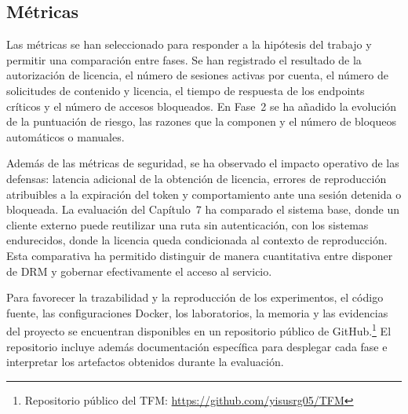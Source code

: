 \subsection{Métricas}

Las métricas se han seleccionado para responder a la hipótesis del trabajo y permitir una comparación entre fases. Se han registrado el resultado de la autorización de licencia, el número de sesiones activas por cuenta, el número de solicitudes de contenido y licencia, el tiempo de respuesta de los endpoints críticos y el número de accesos bloqueados. En Fase~2 se ha añadido la evolución de la puntuación de riesgo, las razones que la componen y el número de bloqueos automáticos o manuales.

Además de las métricas de seguridad, se ha observado el impacto operativo de las defensas: latencia adicional de la obtención de licencia, errores de reproducción atribuibles a la expiración del token y comportamiento ante una sesión detenida o bloqueada. La evaluación del Capítulo~7 ha comparado el sistema base, donde un cliente externo puede reutilizar una ruta sin autenticación, con los sistemas endurecidos, donde la licencia queda condicionada al contexto de reproducción. Esta comparativa ha permitido distinguir de manera cuantitativa entre disponer de DRM y gobernar efectivamente el acceso al servicio.

Para favorecer la trazabilidad y la reproducción de los experimentos, el código fuente, las configuraciones Docker, los laboratorios, la memoria y las evidencias del proyecto se encuentran disponibles en un repositorio público de GitHub.\footnote{Repositorio público del TFM: \url{https://github.com/yisusrg05/TFM}} El repositorio incluye además documentación específica para desplegar cada fase e interpretar los artefactos obtenidos durante la evaluación.
